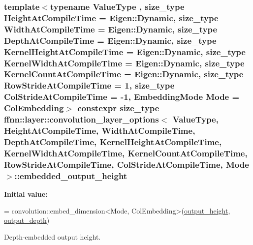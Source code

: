 \hypertarget{structffnn_1_1layer_1_1convolution__layer__options_ae2a4d380f8f534b7df22a264ba18caa7}{
\subsubsection[{embedded\-\_\-output\-\_\-height}]{\setlength{\rightskip}{0pt plus 5cm}template$<$typename Value\-Type , size\-\_\-type Height\-At\-Compile\-Time = Eigen\-::\-Dynamic, size\-\_\-type Width\-At\-Compile\-Time = Eigen\-::\-Dynamic, size\-\_\-type Depth\-At\-Compile\-Time = Eigen\-::\-Dynamic, size\-\_\-type Kernel\-Height\-At\-Compile\-Time = Eigen\-::\-Dynamic, size\-\_\-type Kernel\-Width\-At\-Compile\-Time = Eigen\-::\-Dynamic, size\-\_\-type Kernel\-Count\-At\-Compile\-Time = Eigen\-::\-Dynamic, size\-\_\-type Row\-Stride\-At\-Compile\-Time = 1, size\-\_\-type Col\-Stride\-At\-Compile\-Time = -\/1, Embedding\-Mode Mode = Col\-Embedding$>$ constexpr {\bf size\-\_\-type} {\bf ffnn\-::layer\-::convolution\-\_\-layer\-\_\-options}$<$ Value\-Type, Height\-At\-Compile\-Time, Width\-At\-Compile\-Time, Depth\-At\-Compile\-Time, Kernel\-Height\-At\-Compile\-Time, Kernel\-Width\-At\-Compile\-Time, Kernel\-Count\-At\-Compile\-Time, Row\-Stride\-At\-Compile\-Time, Col\-Stride\-At\-Compile\-Time, Mode $>$\-::embedded\-\_\-output\-\_\-height\hspace{0.3cm}{\ttfamily [static]}}}\label{structffnn_1_1layer_1_1convolution__layer__options_ae2a4d380f8f534b7df22a264ba18caa7}
{\bfseries Initial value\-:}
\begin{DoxyCode}
=
    convolution::embed\_dimension<Mode, ColEmbedding>(\hyperlink{structffnn_1_1layer_1_1convolution__layer__options_a8d7e31a6469ef53b7aa9673722d405b1}{output\_height}, 
      \hyperlink{structffnn_1_1layer_1_1convolution__layer__options_a5f03a7c3b15a4baf82477c5a095e5ace}{output\_depth})
\end{DoxyCode}


Depth-\/embedded output height. 

